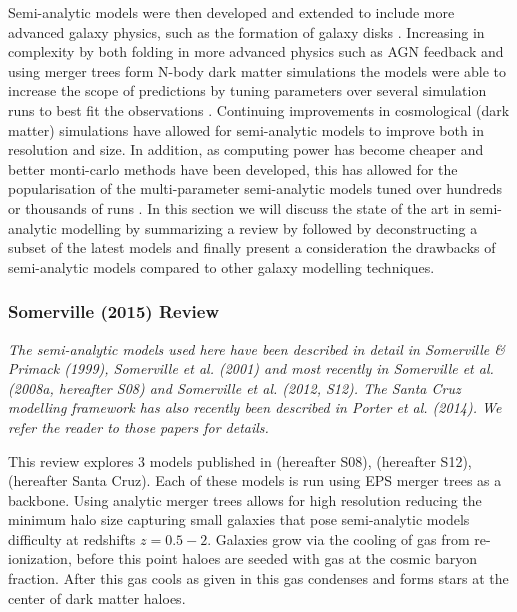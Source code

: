 
Semi-analytic models were then developed and extended to include more advanced galaxy physics, such as the formation of galaxy disks \citep{Mo1998TheDiscs}. Increasing in complexity by both folding in more advanced physics such as AGN feedback and using merger trees form N-body dark matter simulations the models were able to increase the scope of predictions by tuning parameters over several simulation runs to best fit the observations \citep{Bower2006BreakingFormation}. Continuing improvements in cosmological (dark matter) simulations have allowed for semi-analytic models to improve both in resolution and size. In addition, as computing power has become cheaper and better monti-carlo methods have been developed, this has allowed for the popularisation of the multi-parameter semi-analytic models tuned over hundreds or thousands of runs \citep{Guo2011FromCosmology,DeLucia2011TimesCosmology,Fontanot2011TheUniverse,Menci2014TriggeringInteractions,Somerville2015StarGas}.
In this section we will discuss the state of the art in semi-analytic modelling by summarizing a review by \citet{Somerville2015StarGas} followed by deconstructing a subset of the latest models and finally present a consideration the drawbacks of semi-analytic models compared to other galaxy modelling techniques.

\subsubsection{Somerville (2015) Review \citep{Somerville2015StarGas}}
\textit{The semi-analytic models used here have been described in detail in Somerville \& Primack (1999), Somerville et al. (2001) and most recently in Somerville et al. (2008a, hereafter S08) and Somerville et al. (2012, S12). The Santa Cruz modelling framework has also recently been described in Porter et al. (2014). We refer the reader to those papers for details.}

This review explores 3 models published in \citet{Somerville2008ANuclei} (hereafter S08), \citet{Somerville2012GalaxyObservations} (hereafter S12), \citet{Porter2014ModellingSpace} (hereafter Santa Cruz). Each of these models is run using EPS merger trees as a backbone. Using analytic merger trees allows for high resolution reducing the minimum halo size capturing small galaxies that pose semi-analytic models difficulty at redshifts $z = 0.5 - 2$. Galaxies grow via the cooling of gas from re-ionization, before this point haloes are seeded with gas at the cosmic baryon fraction. After this gas cools as given in \cite{White1991GalaxyClustering} this gas condenses and forms stars at the center of dark matter haloes. 

